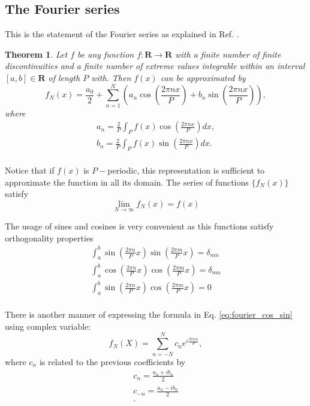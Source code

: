 \documentclass[aps,amssymb,amsmath,amsfonts,pra,superscriptaddress,onecolumn]{revtex4}
\newtheorem{theorem}{Theorem}
\begin{document}
\subsection{The Fourier series}
This is the statement of the Fourier series as explained in Ref. \cite{maths-arfken1999}.
\begin{theorem}
Let $f$ be any function $f: \mathbf{R} \rightarrow \mathbf{R}$ with a finite number of finite discontinuities and a finite number of extreme values integrable within an interval $[a, b] \in \mathbf{R}$ of length $P$ with. Then $f(x)$ can be approximated by
\begin{equation}\label{eq:fourier_cos_sin}
    f_N(x) = \frac{a_0}{2} + \sum_{n = 1}^N \left(a_n \cos\left(\frac{2\pi n x}{P}\right) + b_n \sin\left(\frac{2\pi n x}{P}\right)\right), 
\end{equation}
where
\begin{eqnarray}
    a_n = \frac{2}{P}\int_P f(x) \cos\left(\frac{2\pi n x}{P}\right) dx, \\
    b_n = \frac{2}{P}\int_P f(x) \sin\left(\frac{2\pi n x}{P}\right) dx . \\
\end{eqnarray}
\end{theorem}
Notice that if $f(x)$ is $P-$periodic, this representation is sufficient to approximate the function in all its domain. The series of functions $\lbrace f_N(x)	\rbrace$ satisfy 
\begin{equation}
\lim_{N \rightarrow \infty} f_N(x) = f(x)
\end{equation}

The usage of sines and cosines is very convenient as this functions satisfy orthogonality properties
\begin{eqnarray}
\int_a^b \sin\left(\frac{2\pi n}{P} x \right) \sin\left(\frac{2\pi m}{P} x \right) = \delta_{m n} \\
\int_a^b \cos\left(\frac{2\pi n}{P} x \right) \cos\left(\frac{2\pi m}{P} x \right) = \delta_{m n} \\
\int_a^b \sin\left(\frac{2\pi n}{P} x \right) \cos\left(\frac{2\pi m}{P} x \right) = 0 \\
\end{eqnarray}

There is another manner of expressing the formula in Eq. \eqref{eq:fourier_cos_sin} using complex variable:
\begin{equation}\label{eq:fourier_exp}
    f_N(X) = \sum_{n = -N}^N c_n e^{i \frac{2\pi n x}{P}},
\end{equation}
where $c_n$ is related to the previous coefficients by 
\begin{eqnarray}
    c_n = \frac{a_n + i b_n}{2} \\
    c_{-n} = \frac{a_n - i b_n}{2} \\.
\end{eqnarray}
\end{document}
